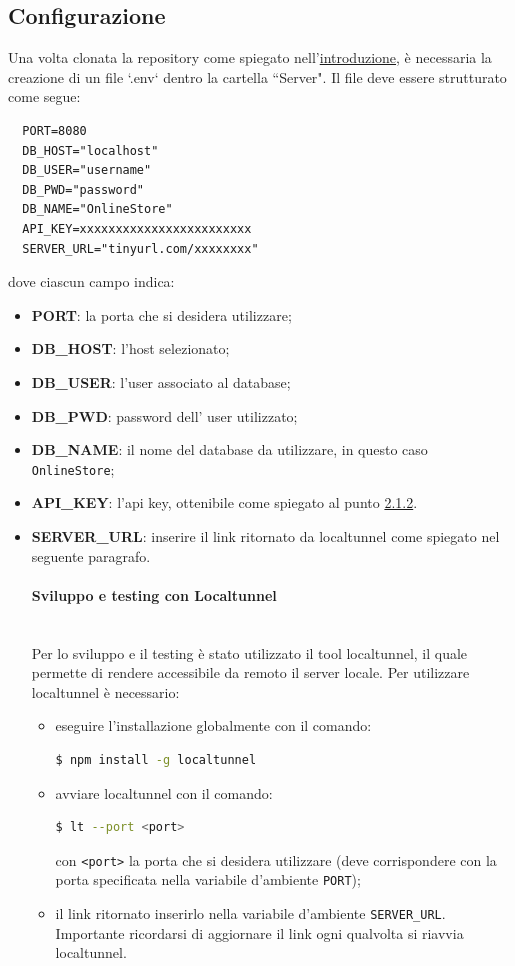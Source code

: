 \documentclass[a4paper, 12pt]{article}
\begin{document}
\subsection{Configurazione}
\label{sec:config_server}
Una volta clonata la repository come spiegato nell'\hyperref[sec:intro]{introduzione}, è necessaria la creazione di un file `.env` dentro la cartella ``Server". Il file deve essere strutturato come segue:
\begin{verbatim}
  PORT=8080
  DB_HOST="localhost"
  DB_USER="username"
  DB_PWD="password"
  DB_NAME="OnlineStore"
  API_KEY=xxxxxxxxxxxxxxxxxxxxxxxx
  SERVER_URL="tinyurl.com/xxxxxxxx"
\end{verbatim}
dove ciascun campo indica:
\begin{itemize}
  \item \textbf{PORT}: la porta che si desidera utilizzare;
  \item \textbf{DB\_HOST}: l'host selezionato;
  \item \textbf{DB\_USER}: l'user associato al database;
  \item \textbf{DB\_PWD}: password dell' user utilizzato;
  \item \textbf{DB\_NAME}: il nome del database da utilizzare, in questo caso \texttt{OnlineStore};
  \item \textbf{API\_KEY}: l'api key, ottenibile come spiegato al punto \hyperref[sec:provider]{2.1.2}.
  \mbox{}
  \item \textbf{SERVER\_URL}: inserire il link ritornato da localtunnel come spiegato nel seguente paragrafo.\\
  \paragraph{Sviluppo e testing con Localtunnel}\\
  Per lo sviluppo e il testing è stato utilizzato il tool localtunnel, il quale permette di rendere accessibile da remoto il server locale. Per utilizzare localtunnel è necessario:
  \begin{itemize}
    \item eseguire l'installazione globalmente con il comando:
    \begin{lstlisting}[language=bash]
      $ npm install -g localtunnel
    \end{lstlisting}
    \item avviare localtunnel con il comando:
    \begin{lstlisting}[language=bash]
      $ lt --port <port>
    \end{lstlisting}
    con \verb|<port>| la porta che si desidera utilizzare (deve corrispondere con la porta specificata nella variabile d'ambiente \verb|PORT|);\\
    \item il link ritornato inserirlo nella variabile d'ambiente \verb|SERVER_URL|. Importante ricordarsi di aggiornare il link ogni qualvolta si riavvia localtunnel.
  \end{itemize}

\end{itemize}
\end{document}
